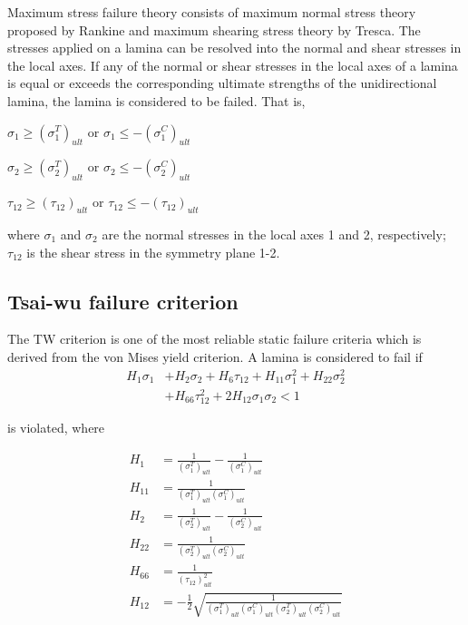 Maximum stress failure theory consists of maximum normal stress theory proposed by Rankine and maximum 
shearing stress theory by Tresca. The stresses applied on a lamina can be resolved into the normal and shear stresses 
in the local axes. If any of the normal or shear stresses in the local axes of a lamina is equal or exceeds the corresponding 
ultimate strengths of the unidirectional lamina, the lamina is considered to be failed. That is,

$\sigma_1 \geq (\sigma _1^{T})_{ult} $ or $\sigma_1 \leq -(\sigma _1^{C})_{ult} $

$\sigma_2 \geq (\sigma _2^{T})_{ult} $ or $\sigma_2 \leq -(\sigma _2^{C})_{ult} $

$\tau_{12} \geq (\tau_{12})_{ult} $  or $\tau_{12} \leq -(\tau_{12})_{ult} $

where $\sigma_1$ and $\sigma_2$ are the normal stresses in the local axes 1 and 2, respectively;
$\tau_{12}$ is the shear stress in the symmetry plane 1-2.

\subsection{Tsai-wu failure criterion}
The TW criterion is one of the most reliable static failure criteria which is derived from the von
Mises yield criterion.  
A lamina is considered to fail
if \begin{equation} \label{eq:tsai_wu}
\begin{split}
	H_1 \sigma_1  & + H_2 \sigma_2 + H_6 \tau_{12} + H_{11}\sigma_1^2 + H_{22} \sigma_2^2 \\
				  & + H_{66}  \tau_{12}^2 + 2H_{12}\sigma_1\sigma_2 < 1
\end{split}
\end{equation}

is violated, where

\begin{equation}
	\begin{split}
		H_{1}&=\frac{1}{\left(\sigma_{1}^{T}\right)_{u l t}}-\frac{1}{\left(\sigma_{1}^{C}\right)_{u l t}} \\
		H_{11}&=\frac{1}{\left(\sigma_{1}^{T}\right)_{u l t}\left(\sigma_{1}^{C}\right)_{u l t}} \\
		H_{2}&=\frac{1}{\left(\sigma_{2}^{T}\right)_{u l t}}-\frac{1}{\left(\sigma_{2}^{C}\right)_{u l t}} \\
		H_{22}&=\frac{1}{\left(\sigma_{2}^{T}\right)_{u l t}\left(\sigma_{2}^{C}\right)_{u l t}} \\
		H_{66}&=\frac{1}{\left(\tau_{12}\right)_{u l t}^{2}} \\
		H_{12}&=-\frac{1}{2} \sqrt{\frac{1}{\left(\sigma_{1}^{T}\right)_{u l
		t}\left(\sigma_{1}^{C}\right)_{u l t}\left(\sigma_{2}^{T}\right)_{u l
		t}\left(\sigma_{2}^{C}\right)_{u l t}}}
	\end{split}
\end{equation}

